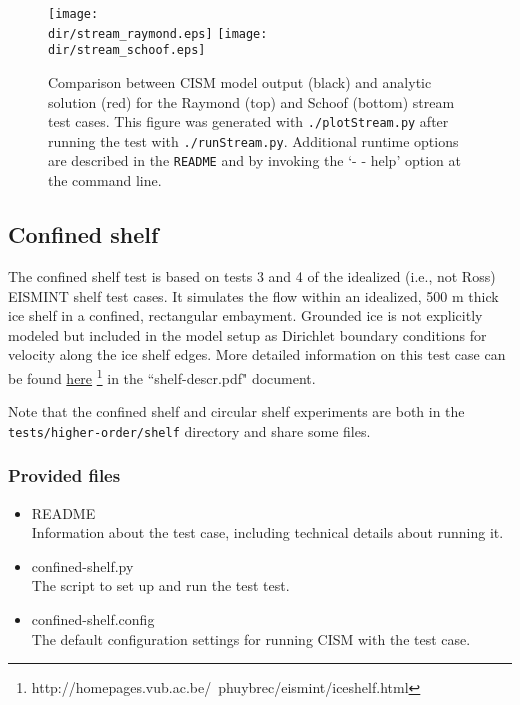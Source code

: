 	
\begin{figure}[H!]
  \begin{center}
	\texttt{[image: \\dir/stream\_raymond.eps]}
	\texttt{[image: \\dir/stream\_schoof.eps]}
  \end{center}
  \caption{Comparison between CISM model output (black) and analytic solution (red) for the Raymond (top) and Schoof (bottom) stream test cases. This figure was generated with \texttt{./plotStream.py} after running the test with \texttt{./runStream.py}.
Additional runtime options are described in the \texttt{README} and by invoking the `- - help' option at the command line.}
  \label{fig:stream-results}
\end{figure} 

\subsection{Confined shelf}
The confined shelf test is based on tests 3 and 4 of the idealized (i.e., not Ross) EISMINT shelf test 
cases.  It simulates the flow within an idealized, 500 m thick ice shelf in a 
confined, rectangular embayment.  Grounded ice is not explicitly modeled but included in the 
model setup as Dirichlet boundary conditions for velocity along the ice shelf edges.
More detailed information on this test case can be found 
\href{http://homepages.vub.ac.be/~phuybrec/eismint/iceshelf.html}{here}
\footnote{http://homepages.vub.ac.be/~phuybrec/eismint/iceshelf.html} in the 
``shelf-descr.pdf" document.

Note that the confined shelf and circular shelf experiments are both in the 
\texttt{tests/higher-order/shelf} directory and share some files.

\subsubsection{Provided files}

\begin{itemize}
	\item README \\
		Information about the test case, including technical details about running it.
	\item confined-shelf.py \\
		The script to set up and run the test test.
	\item confined-shelf.config \\
  The default configuration settings for running CISM with the test case.
\end{itemize}

